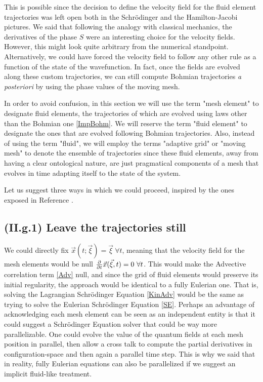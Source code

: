 \documentclass[11pt, a4paper]{article} %
\begin{document}
This is possible since the decision to define the velocity field for the fluid element trajectories was left open both in the Schrödinger and the Hamilton-Jacobi pictures. We said that following the analogy with classical mechanics, the derivatives of the phase $S$ were an interesting choice for the velocity fields. However, this might look quite arbitrary from the numerical standpoint. Alternatively, we could have forced the velocity field to follow any other rule as a function of the state of the wavefunction. In fact, once the fields are evolved along these custom trajectories, we can still compute Bohmian trajectories {\em a posteriori} by using the phase values of the moving mesh. \vspace{-0.1cm}

In order to avoid confusion, in this section we will use the term "mesh element" to designate fluid elements, the trajectories of which are evolved using laws other than the Bohmian one \eqref{ImpBohm}. We will reserve the term "fluid element" to designate the ones that are evolved following Bohmian trajectories. Also, instead of using the term "fluid", we will employ the terms "adaptive grid" or "moving mesh" to denote the ensemble of trajectories since these fluid elements, away from having a clear ontological nature, are just pragmatical components of a mesh that evolves in time adapting itself to the state of the system. \vspace{-0.1cm}

\hspace{-0.2cm}Let us suggest three ways in which we could proceed, inspired by the ones exposed in Reference \cite{Wyatt}.\vspace{-0.3cm}

\subsection*{\bf (II.g.1) Leave the trajectories still}\vspace{-0.2cm}
 We could directly fix $\vec{x}(t;\vec{\xi})=\vec{\xi}\ \forall t$, meaning that the velocity field for the mesh elements would be null $\pdv{}{t}\vec{x}(\vec{\xi},t)=0\ \forall t$. This would make the Advective correlation term \eqref{Adv} null, and since the grid of fluid elements would preserve its initial regularity, the approach would be identical to a fully Eulerian one. That is, solving the Lagrangian Schrödinger Equation \eqref{KinAdv} would be the same as trying to solve the Eulerian Schrödinger Equation \eqref{SE}. Perhaps an advantage of acknowledging each mesh element can be seen as an independent entity is that it could suggest a Schrödinger Equation solver that could be way more parallelizable. One could evolve the value of the quantum fields at each mesh position in parallel, then allow a cross talk to compute the partial derivatives in configuration-space and then again a parallel time step. This is why we said that in reality, fully Eulerian equations can also be parallelized if we suggest an implicit fluid-like treatment.\vspace{-0.2cm}
\end{document}
